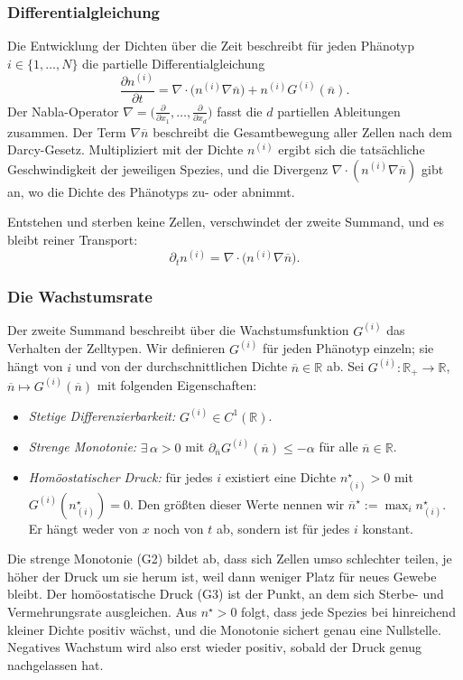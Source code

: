 \documentclass[11pt]{article}
\newcommand{\nbar}{\overline{n}}
\begin{document}
\subsubsection{Differentialgleichung}
Die Entwicklung der Dichten über die Zeit beschreibt für jeden Phänotyp $i \in
\{1, \dots, N\}$ die partielle Differentialgleichung
\begin{equation}
    \frac{\partial n^{(i)}}{\partial t}
    = \nabla \cdot \bigl( n^{(i)} \nabla \nbar \bigr) + n^{(i)} G^{(i)}(\nbar).
    \label{eq:pde}
\end{equation}
Der Nabla-Operator $\nabla = \bigl( \tfrac{\partial}{\partial x_1}, \dots,
\tfrac{\partial}{\partial x_d} \bigr)$ fasst die $d$ partiellen Ableitungen
zusammen. Der Term $\nabla \nbar$ beschreibt die Gesamtbewegung aller Zellen nach
dem Darcy-Gesetz. Multipliziert mit der Dichte $n^{(i)}$ ergibt sich die
tatsächliche Geschwindigkeit der jeweiligen Spezies, und die Divergenz $\nabla
\cdot (n^{(i)} \nabla \nbar)$ gibt an, wo die Dichte des Phänotyps zu- oder
abnimmt.

Entstehen und sterben keine Zellen, verschwindet der zweite Summand, und es
bleibt reiner Transport:
\begin{equation}
    \partial_t n^{(i)} = \nabla \cdot \bigl( n^{(i)} \nabla \nbar \bigr).
\end{equation}

\subsubsection{Die Wachstumsrate}
Der zweite Summand beschreibt über die Wachstumsfunktion $G^{(i)}$ das Verhalten
der Zelltypen. Wir definieren $G^{(i)}$ für jeden Phänotyp einzeln; sie hängt von
$i$ und von der durchschnittlichen Dichte $\nbar \in \mathbb{R}$ ab. Sei
$G^{(i)} \colon \mathbb{R}_+ \to \mathbb{R}$, $\nbar \mapsto G^{(i)}(\nbar)$ mit
folgenden Eigenschaften:
\begin{itemize}
    \item[(G1)] \emph{Stetige Differenzierbarkeit:} $G^{(i)} \in C^1(\mathbb{R})$.
    \item[(G2)] \emph{Strenge Monotonie:} $\exists\, \alpha > 0$ mit
    $\partial_{\nbar} G^{(i)}(\nbar) \le -\alpha$ für alle $\nbar \in \mathbb{R}$.
    \item[(G3)] \emph{Homöostatischer Druck:} für jedes $i$ existiert eine Dichte
    $n^{\star}_{(i)} > 0$ mit $G^{(i)}(n^{\star}_{(i)}) = 0$. Den größten dieser
    Werte nennen wir $\nbar^{\star} := \max_{i} n^{\star}_{(i)}$. Er hängt weder
    von $x$ noch von $t$ ab, sondern ist für jedes $i$ konstant.
\end{itemize}
Die strenge Monotonie (G2) bildet ab, dass sich Zellen umso schlechter teilen, je
höher der Druck um sie herum ist, weil dann weniger Platz für neues Gewebe bleibt.
Der homöostatische Druck (G3) ist der Punkt, an dem sich Sterbe- und
Vermehrungsrate ausgleichen. Aus $n^{\star} > 0$ folgt, dass jede Spezies bei
hinreichend kleiner Dichte positiv wächst, und die Monotonie sichert genau eine
Nullstelle. Negatives Wachstum wird also erst wieder positiv, sobald der Druck
genug nachgelassen hat.
\end{document}
